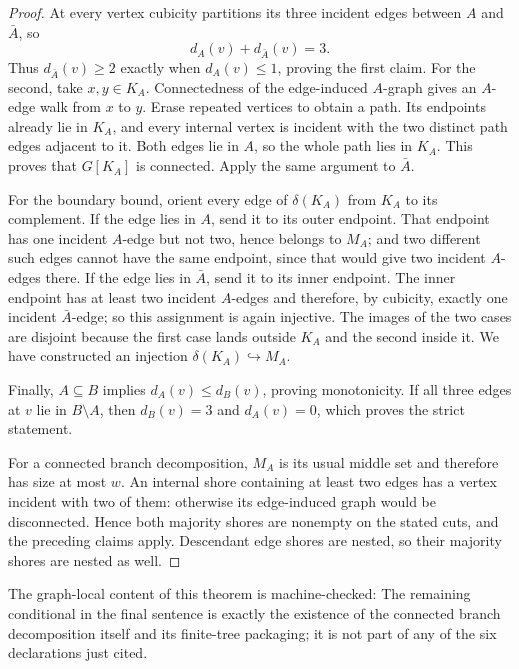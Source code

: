 \begin{proof}
At every vertex cubicity partitions its three incident edges between \(A\)
and \(\bar A\), so
\[
                         d_A(v)+d_{\bar A}(v)=3.
\]
Thus \(d_{\bar A}(v)\ge2\) exactly when \(d_A(v)\le1\), proving the first
claim.  For the second, take \(x,y\in K_A\).  Connectedness of the
edge-induced \(A\)-graph gives an \(A\)-edge walk from \(x\) to \(y\).
Erase repeated vertices to obtain a path.  Its endpoints already lie in
\(K_A\), and every internal vertex is incident with the two distinct path
edges adjacent to it.  Both edges lie in \(A\), so the whole path lies in
\(K_A\).  This proves that \(G[K_A]\) is connected.  Apply the same argument
to \(\bar A\).

For the boundary bound, orient every edge of
\(\delta(K_A)\) from \(K_A\) to its complement.  If the edge lies in \(A\),
send it to its outer endpoint.  That endpoint has one incident \(A\)-edge
but not two, hence belongs to \(M_A\); and two different such edges cannot
have the same endpoint, since that would give two incident \(A\)-edges
there.  If the edge lies in \(\bar A\), send it to its inner endpoint.
The inner endpoint has at least two incident \(A\)-edges and therefore, by
cubicity, exactly one incident \(\bar A\)-edge; so this assignment is again
injective.  The images of the two cases are disjoint because the first
case lands outside \(K_A\) and the second inside it.  We have constructed an
injection \(\delta(K_A)\hookrightarrow M_A\).

Finally, \(A\subseteq B\) implies \(d_A(v)\le d_B(v)\), proving monotonicity.
If all three edges at \(v\) lie in \(B\setminus A\), then
\(d_B(v)=3\) and \(d_A(v)=0\), which proves the strict statement.

For a connected branch decomposition, \(M_A\) is its usual middle set and
therefore has size at most \(w\).  An internal shore containing at least two
edges has a vertex incident with two of them: otherwise its edge-induced
graph would be disconnected.  Hence both majority shores are nonempty on
the stated cuts, and the preceding claims apply.  Descendant edge shores
are nested, so their majority shores are nested as well.
\end{proof}

The graph-local content of this theorem is machine-checked:
The remaining conditional in the final sentence is exactly the existence of
the connected branch decomposition itself and its finite-tree packaging; it
is not part of any of the six declarations just cited.

